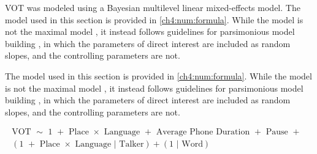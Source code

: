 VOT was modeled using a Bayesian multilevel linear mixed-effects model. The model used in this section is provided in \ref{ch4:num:formula}. While the model is not the maximal model \citep{barr_2013_maximal}, it instead follows guidelines for parsimonious model building \citep{bates_2018_parsimonious}, in which the parameters of direct interest are included as random slopes, and the controlling parameters are not. 

The model used in this section is provided in \ref{ch4:num:formula}. While the model is not the maximal model \citep{barr_2013_maximal}, it instead follows guidelines for parsimonious model building \citep{bates_2018_parsimonious}, in which the parameters of direct interest are included as random slopes, and the controlling parameters are not. 

\begin{equation}
  \begin{aligned}\label{ch4:num:formula}
    \text{VOT } \sim \text{ 1 } + \text{ Place } \times \text{ Language } + \text{ Average Phone Duration } + \text{ Pause } + \text{ } \\
    (\text{1 } + \text{ Place } \times \text{ Language }|\text{ Talker}) + (\text{1 }| \text{ Word})
  \end{aligned}
\end{equation} 
\newline


